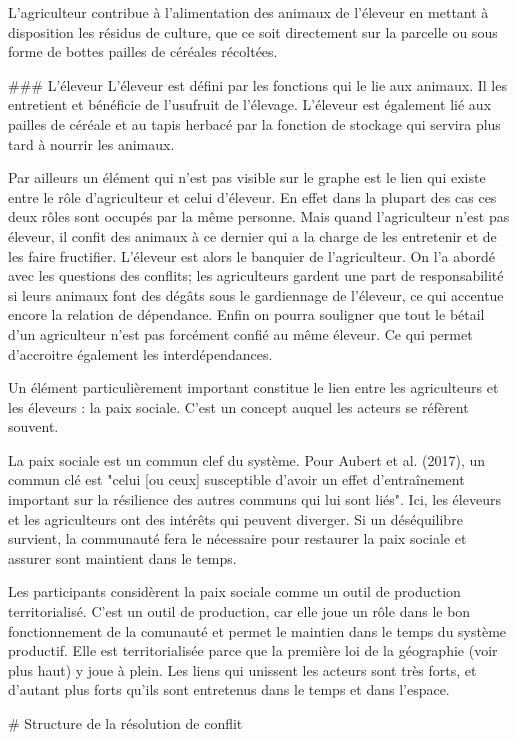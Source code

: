 L'agriculteur contribue à l'alimentation des animaux de l'éleveur en mettant à disposition les résidus de culture, que ce soit directement sur la parcelle ou sous forme de bottes pailles de céréales récoltées. 

### L'éleveur
L'éleveur est défini par les fonctions qui le lie aux animaux. Il les entretient et bénéficie de l'usufruit de l'élevage. L'éleveur est également lié aux pailles de céréale et au tapis herbacé par la fonction de stockage qui servira plus tard à nourrir les animaux.

Par ailleurs un élément qui n'est pas visible sur le graphe est le lien qui existe entre le rôle d'agriculteur et celui d'éleveur. En effet dans la plupart des cas ces deux rôles sont occupés par la même personne. Mais quand l'agriculteur n'est pas éleveur, il confit des animaux à ce dernier qui a la charge de les entretenir et de les faire fructifier. L'éleveur est alors le banquier de l'agriculteur. On l'a abordé avec les questions des conflits; les agriculteurs gardent une part de responsabilité si leurs animaux font des dégâts sous le gardiennage de l'éleveur, ce qui accentue encore la relation de dépendance. Enfin on pourra souligner que tout le bétail d'un agriculteur n'est pas forcément confié au même éleveur. Ce qui permet d'accroitre également les interdépendances.

Un élément particulièrement important constitue le lien entre les agriculteurs et les éleveurs : la paix sociale. C'est un concept auquel les acteurs se réfèrent souvent.

La paix sociale est un commun clef du système. Pour Aubert et al. (2017), un commun clé est "celui [ou ceux] susceptible d’avoir un effet d’entraînement important sur la résilience des autres communs qui lui sont liés". Ici, les éleveurs et les agriculteurs ont des intérêts qui peuvent diverger. Si un déséquilibre survient, la communauté fera le nécessaire pour restaurer la paix sociale et assurer sont maintient dans le temps.

Les participants considèrent la paix sociale comme un outil de production territorialisé. C'est un outil de production, car elle joue un rôle dans le bon fonctionnement de la comunauté et permet le maintien dans le temps du système productif. Elle est territorialisée parce que la première loi de la géographie (voir plus haut) y joue à plein. Les liens qui unissent les acteurs sont très forts, et d'autant plus forts qu'ils sont entretenus dans le temps et dans l'espace. 

# Structure de la résolution de conflit


